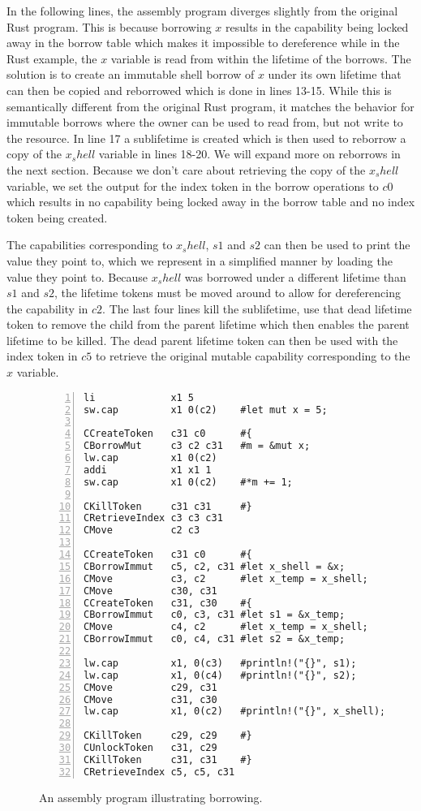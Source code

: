 In the following lines, the assembly program diverges slightly from the original Rust program.
This is because borrowing $x$ results in the capability being locked away in the borrow table which makes it impossible to dereference while in the Rust example, the $x$ variable is read from within the lifetime of the borrows.
The solution is to create an immutable shell borrow of $x$ under its own lifetime that can then be copied and reborrowed which is done in lines 13-15.
While this is semantically different from the original Rust program, it matches the behavior for immutable borrows where the owner can be used to read from, but not write to the resource.
In line 17 a sublifetime is created which is then used to reborrow a copy of the $x_shell$ variable in lines 18-20.
We will expand more on reborrows in the next section.
Because we don't care about retrieving the copy of the $x_shell$ variable, we set the output for the index token in the borrow operations to $c0$ which results in no capability being locked away in the borrow table and no index token being created.

The capabilities corresponding to $x_shell$, $s1$ and $s2$ can then be used to print the value they point to, which we represent in a simplified manner by loading the value they point to.
Because $x_shell$ was borrowed under a different lifetime than $s1$ and $s2$, the lifetime tokens must be moved around to allow for dereferencing the capability in $c2$.
The last four lines kill the sublifetime, use that dead lifetime token to remove the child from the parent lifetime which then enables the parent lifetime to be killed.
The dead parent lifetime token can then be used with the index token in $c5$ to retrieve the original mutable capability corresponding to the $x$ variable.

\begin{figure}[h]
\begin{lstlisting}[style=custASM, numbers = left ,xleftmargin=1.5em]
li             x1 5
sw.cap         x1 0(c2)    #let mut x = 5;

CCreateToken   c31 c0      #{
CBorrowMut     c3 c2 c31   #m = &mut x;
lw.cap         x1 0(c2)
addi           x1 x1 1
sw.cap         x1 0(c2)    #*m += 1;

CKillToken     c31 c31     #}
CRetrieveIndex c3 c3 c31
CMove          c2 c3

CCreateToken   c31 c0      #{
CBorrowImmut   c5, c2, c31 #let x_shell = &x;
CMove          c3, c2      #let x_temp = x_shell;
CMove          c30, c31
CCreateToken   c31, c30    #{
CBorrowImmut   c0, c3, c31 #let s1 = &x_temp;
CMove          c4, c2      #let x_temp = x_shell;
CBorrowImmut   c0, c4, c31 #let s2 = &x_temp;

lw.cap         x1, 0(c3)   #println!("{}", s1);
lw.cap         x1, 0(c4)   #println!("{}", s2);
CMove          c29, c31
CMove          c31, c30
lw.cap         x1, 0(c2)   #println!("{}", x_shell);

CKillToken     c29, c29    #}
CUnlockToken   c31, c29
CKillToken     c31, c31    #}
CRetrieveIndex c5, c5, c31
\end{lstlisting}
\caption{An assembly program illustrating borrowing.}
\label{fig:asmborrowexample}
\end{figure}

